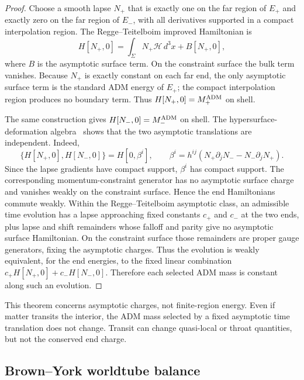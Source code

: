 \documentclass[aps,prd,10pt,onecolumn,nofootinbib,superscriptaddress,floatfix]{revtex4-2}
\begin{document}
\begin{proof}
Choose a smooth lapse $N_+$ that is exactly one on the far region of $E_+$ and
exactly zero on the far region of $E_-$, with all derivatives supported in a
compact interpolation region.  The Regge--Teitelboim improved Hamiltonian is
\begin{equation}
  H[N_+,0]=\int_\Sigma N_+\mathcal H\,d^3x+B[N_+,0],
\end{equation}
where $B$ is the asymptotic surface term.  On the constraint surface the bulk
term vanishes.  Because $N_+$ is exactly constant on each far end, the only
asymptotic surface term is the standard ADM energy of $E_+$; the compact
interpolation region produces no boundary term.  Thus $H[N_+,0]=M_+^{\rm ADM}$
on shell.

The same construction gives $H[N_-,0]=M_-^{\rm ADM}$ on shell.  The
hypersurface-deformation algebra~\cite{HojmanKucharTeitelboim1976Geometrodynamics}
shows that the two asymptotic translations are independent.  Indeed,
\begin{equation}
  \{H[N_+,0],H[N_-,0]\}=H[0,\beta^i],
  \qquad
  \beta^i=h^{ij}(N_+\partial_jN_- - N_-\partial_jN_+).
\end{equation}
Since the lapse gradients have compact support, $\beta^i$ has compact support.
The corresponding momentum-constraint generator has no asymptotic surface
charge and vanishes weakly on the constraint surface.  Hence the end
Hamiltonians commute weakly.  Within the Regge--Teitelboim asymptotic class,
an admissible time evolution has a lapse approaching fixed constants $c_+$ and
$c_-$ at the two ends, plus lapse and shift remainders whose falloff and parity
give no asymptotic surface Hamiltonian.  On the constraint surface those
remainders are proper gauge generators, fixing the asymptotic charges.  Thus
the evolution is weakly equivalent, for the
end energies, to the fixed linear combination
$c_+H[N_+,0]+c_-H[N_-,0]$.  Therefore each selected ADM mass is constant along
such an evolution.
\end{proof}

This theorem concerns asymptotic charges, not finite-region energy.  Even if
matter transits the interior, the ADM mass selected by a fixed asymptotic time
translation does not change.  Transit can change quasi-local or throat
quantities, but not the conserved end charge.

\subsection{Brown--York worldtube balance}
\end{document}
